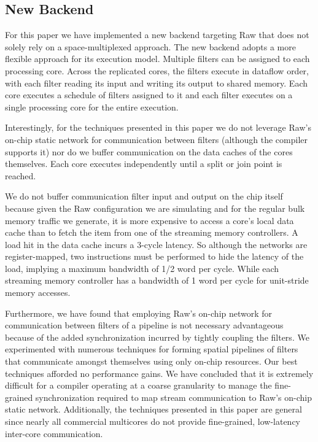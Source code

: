 \subsection{New Backend}
For this paper we have implemented a new backend targeting Raw that
does not solely rely on a space-multiplexed approach.  The new backend
adopts a more flexible approach for its execution model. Multiple
filters can be assigned to each processing core.  Across the
replicated cores, the filters execute in dataflow order, with each
filter reading its input and writing its output to shared memory. Each
core executes a schedule of filters assigned to it and each filter
executes on a single processing core for the entire execution.

Interestingly, for the techniques presented in this paper we do not
leverage Raw's on-chip static network for communication between
filters (although the compiler supports it) nor do we buffer
communication on the data caches of the cores themselves. Each core
executes independently until a split or join point is reached. 

We do not buffer communication filter input and output on the chip
itself because given the Raw configuration we are simulating and for
the regular bulk memory traffic we generate, it is more expensive to
access a core's local data cache than to fetch the item from one of
the streaming memory controllers. A load hit in the data cache incurs
a 3-cycle latency.  So although the networks are register-mapped, two
instructions must be performed to hide the latency of the load,
implying a maximum bandwidth of 1/2 word per cycle.  While each
streaming memory controller has a bandwidth of 1 word per cycle for
unit-stride memory accesses.

Furthermore, we have found that employing Raw's on-chip network for
communication between filters of a pipeline is not necessary
advantageous because of the added synchronization incurred by tightly
coupling the filters.  We experimented with numerous techniques for
forming spatial pipelines of filters that communicate amongst
themselves using only on-chip resources.  Our best techniques afforded
no performance gains.  We have concluded that it is extremely
difficult for a compiler operating at a coarse granularity to manage
the fine-grained synchronization required to map stream communication
to Raw's on-chip static network.  Additionally, the techniques
presented in this paper are general since nearly all commercial
multicores do not provide fine-grained, low-latency inter-core
communication.

